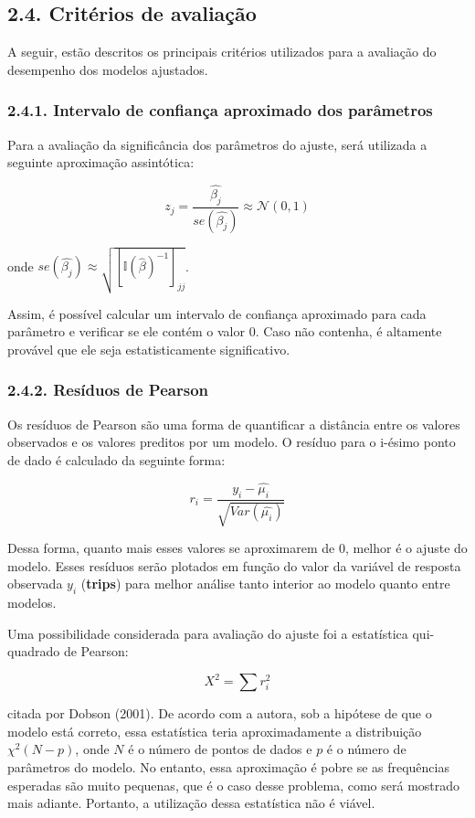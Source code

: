 \documentclass[
]{article}
\begin{document}
\subsection{2.4. Critérios de
avaliação}\label{crituxe9rios-de-avaliauxe7uxe3o}

A seguir, estão descritos os principais critérios utilizados para a
avaliação do desempenho dos modelos ajustados.

\subsubsection{2.4.1. Intervalo de confiança aproximado dos
parâmetros}\label{intervalo-de-confianuxe7a-aproximado-dos-paruxe2metros}

Para a avaliação da significância dos parâmetros do ajuste, será
utilizada a seguinte aproximação assintótica:

\[
z_j = \dfrac{\hat{\beta_j}}{se(\hat{\beta_j})} \approx \mathcal{N}(0, 1)
\]

onde
\(se(\hat{\beta_j}) \approx \sqrt{[\mathbb{I}(\hat{\beta})^{-1}]_{jj}}\).

Assim, é possível calcular um intervalo de confiança aproximado para
cada parâmetro e verificar se ele contém o valor 0. Caso não contenha, é
altamente provável que ele seja estatisticamente significativo.

\subsubsection{2.4.2. Resíduos de Pearson}\label{resuxedduos-de-pearson}

Os resíduos de Pearson são uma forma de quantificar a distância entre os
valores observados e os valores preditos por um modelo. O resíduo para o
i-ésimo ponto de dado é calculado da seguinte forma:

\[
r_i = \dfrac{y_i - \hat{\mu_i}}{\sqrt{Var(\hat{\mu_i})}}
\]

Dessa forma, quanto mais esses valores se aproximarem de 0, melhor é o
ajuste do modelo. Esses resíduos serão plotados em função do valor da
variável de resposta observada \(y_i\) (\textbf{trips}) para melhor
análise tanto interior ao modelo quanto entre modelos.

Uma possibilidade considerada para avaliação do ajuste foi a estatística
qui-quadrado de Pearson:

\[
X^2 = \sum r_i^2
\]

citada por Dobson (2001). De acordo com a autora, sob a hipótese de que
o modelo está correto, essa estatística teria aproximadamente a
distribuição \(\chi^2(N-p)\), onde \(N\) é o número de pontos de dados e
\(p\) é o número de parâmetros do modelo. No entanto, essa aproximação é
pobre se as frequências esperadas são muito pequenas, que é o caso desse
problema, como será mostrado mais adiante. Portanto, a utilização dessa
estatística não é viável.
\end{document}
